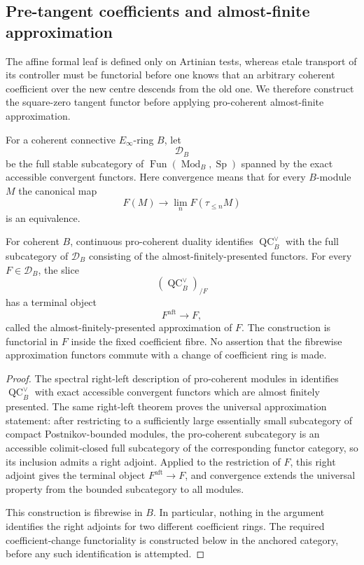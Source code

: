 \subsection{Pre-tangent coefficients and almost-finite approximation}
\label{sec:bnla-pre-tangent-aft}

The affine formal leaf is defined only on Artinian tests, whereas etale
transport of its controller must be functorial before one knows that an
arbitrary coherent coefficient over the new centre descends from the old
one.  We therefore construct the square-zero tangent functor before applying
pro-coherent almost-finite approximation.

\begin{definition}
\label{def:bnla-pre-procoherent-functors}
For a coherent connective $E_\infty$-ring $B$, let
\[
    \mathcal D_B
\]
be the full stable subcategory of
$\operatorname{Fun}(\operatorname{Mod}_B,\operatorname{Sp})$ spanned by the
exact accessible convergent functors.  Here convergence means that for every
$B$-module $M$ the canonical map
\[
    F(M)
    \longrightarrow
    \lim_n F(\tau_{\leq n}M)
\]
is an equivalence.
\end{definition}

\begin{proposition}
\label{prop:bnla-pre-tangent-aft-approximation}
For coherent $B$, continuous pro-coherent duality identifies
$\operatorname{QC}^{\vee}_B$ with the full subcategory of $\mathcal D_B$
consisting of the almost-finitely-presented functors.  For every
$F\in\mathcal D_B$, the slice
\[
    \left(\operatorname{QC}^{\vee}_B\right)_{/F}
\]
has a terminal object
\[
\boxed{
    F^{\mathrm{aft}}\longrightarrow F,}
\]
called the almost-finitely-presented approximation of $F$.  The construction
is functorial in $F$ inside the fixed coefficient fibre.  No assertion that
the fibrewise approximation functors commute with a change of coefficient
ring is made.
\end{proposition}

\begin{proof}
The spectral right-left description of pro-coherent modules in
\cite{BrantnerCamposNuiten2025} identifies
$\operatorname{QC}^{\vee}_B$ with exact accessible convergent functors which
are almost finitely presented.  The same right-left theorem proves the
universal approximation statement: after restricting to a sufficiently
large essentially small subcategory of compact Postnikov-bounded modules, the
pro-coherent subcategory is an accessible colimit-closed full subcategory of
the corresponding functor category, so its inclusion admits a right adjoint.
Applied to the restriction of $F$, this right adjoint gives the terminal
object $F^{\mathrm{aft}}\to F$, and convergence extends the universal property
from the bounded subcategory to all modules.

This construction is fibrewise in $B$.  In particular, nothing in the
argument identifies the right adjoints for two different coefficient rings.
The required coefficient-change functoriality is constructed below in the
anchored category, before any such identification is attempted.
\end{proof}

